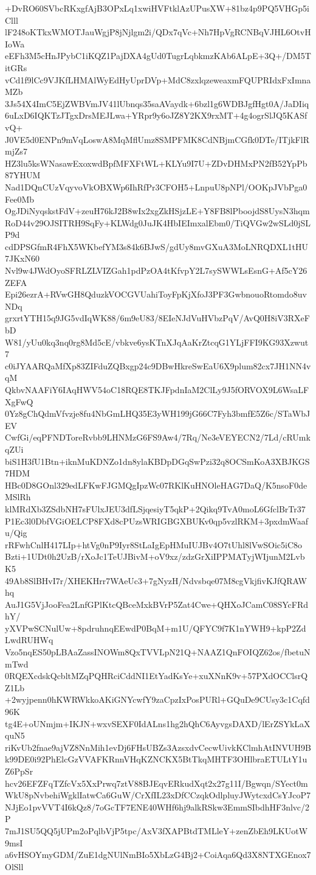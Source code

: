+DvRO60SVbcRKxgfAjB3OPxLq1xwiHVFtklAzUPusXW+81bz4p9PQ5VHGp5iClll
lF248oKTkxWMOTJauWgjP8jNjlgm2i/QDx7qVc+Nh7HpVgRCNBqVJHL6OtvHIoWa
eEFh3M5cHnJPybC1iKQZ1PajDXA4gUd0TugrLqbkmzKAb6ALpE+3Q+/DM5TitGRs
vCd1f9lCc9VJKfLHMAlWyEdHyUprDVp+MdC8zxlqzeweaxmFQUPRIdxFxImnaMZb
3Js54X4ImC5EjZWBVmJV41lUbnqs35saAVaydk+6bzl1g6WDBJgfHgt0A/JaDIiq
6uLxD6IQKTzJTgxDrsMEJLwa+YRpr9y6oJZ8Y2KX9rxMT+4g4ogrSlJQ5KASfvQ+
J0VE5d0ENPn9mVqLoswA8MqMflUmz8SMPFMK8CdNBjmCGfk0DTe/ITjkFlRmjZs7
HZ3lu5ksWNasawExoxwdBpfMFXFtWL+KLYu9I7U+ZDvDHMxPN2fB52YpPb87YHUM
Nad1DQnCUzVqyvoVkOBXWp6IhRfPr3CFOH5+LnpuU8pNPl/OOKpJVbPga0Fee0Mb
OgJDiNyqskstFdV+zeuH76kJ2B8wIx2xgZkHSjzLE+Y8FB8lPboojdS8UysN3hqm
RoD44v29OJSITRH9SqFy+KLWdg0JuJK4HbIEImxalEbm0/TiQVGw2wSLd0jSLP9d
cdDPSGfmR4FhX5WKbefYM3s84k6BJwS/gdUy8mvGXuA3MoLNRQDXL1tHU7JKxN60
Nvl9w4JWdOyoSFRLZLVIZGah1pdPzOA4tKfvpY2L7sySWWLsEsnG+Af5cY26ZEFA
Epi26ezrA+RVwGH8QduzkVOCGVUahiToyFpKjXfoJ3PF3GwbnouoRtomdo8uvNDq
grxrtYTH15q9JG5vdIqWK88/6m9eU83/8EIeNJdVuHVbzPqV/AvQ0H8iV3RXeFbD
W81/yUu0kq3nq0rg8Md5cE/vbkve6ysKTnXJqAaKrZtcqG1YLjFFI9KG93Xzwut7
c0iJYAARQaMfXp83ZIFduZQBxgp24c9DBwHkreSwEaU6X9plum82cx7JH1NN4vqM
QkbvNAAFiY6IAqHWV54oC18RQE8TKJFpdnIaM2ClLy9J5fORVOX9L6WsaLFXgFwQ
0Yz8gChQdmVfvzje8fu4NbGmLHQ35E3yWH199jG66C7Fyh3bmfE5Z6c/STaWbJEV
CwfGi/eqPFNDToreRvbb9LHNMzG6FS9Aw4/7Rq/Ne3eVEYECN2/7Ld/cRUmkqZUi
biS1H3fU1Btn+iknMuKDNZo1dn8ylaKBDpDGqSwPzi32q8OCSmKoA3XBJKGS7HDM
HBc0D8GOnl329edLFKwFJGMQgIpzWc07RKlKuHNOleHAG7DaQ/K5nsoF0deMSlRh
klMRdXb3ZSdbNH7sFUlxJEU3dfLSjqesiyT5qkP+2Qikq9TvA0moL6GfclBrTr37
P1Ec3l0DbfVGiOELCP8FXd8cPUzsWRIGBGXBUKv0qp5vzlRKM+3pxdmWaafu/Qig
rRFwhCnlH417LIp+htVg0nP9Iyr8StLaIgEpHMuIUJBv4O7tUhl8lVwSOic5iC8o
Bzti+1UDt0h2UzB/rXoJc1TeUJBivM+oV9xz/zdzGrXiIPPMATyjWIjunM2LvbK5
49Ab8SlBHvI7r/XHEKHrr7WAeUc3+7gNyzH/Ndvsbqe07M8cgVkjfivKJfQRAWhq
AuJ1G5VjJooFea2LnfGPlKtcQBceMxkBVrP5Zat4Cwe+QHXoJCamC08SYcFRdhY/
yXVPwSCNulUw+8pdruhnqEEwdP0BqM+m1U/QFYC9f7K1nYWH9+kpP2ZdLwdRUHWq
Vzo5nqES50pLBAaZassINOWm8QxTVVLpN21Q+NAAZ1QnFOIQZ62os/fbetuNmTwd
0RQEXcdskQcbltMZqPQHRciCddNI1EtYadKsYe+xuXNnK9v+57PXdOCClsrQZ1Lb
+2wyjpenn0hKWRWkkoAKiGNYcwfY9zaCpzIxPosPURl+GQuDe9CUsy3c1Cqfd96K
tg4E+oUNmjm+IKJN+wxvSEXF0IdALns1hg2hQhC6AyvgsDAXD/lErZSYkLaXquN5
riKvUb2fnae9ajVZ8NnMih1evDj6FHsUBZs3AzsxdvCecwUivkKClmhAtINVUH9B
k99DE0i92PhElcGzVVAFKRnnVHqKZNCKX5BtTkqMHTF3OHlbraETULtY1uZ6PpSr
hcv26EFZFqTZfcVx5XxPrwq7ztV88BJEqvERkudXqt2x27g11I/Bgwqn/SYect0m
WkU8pNvbehiWgklIatwCa6GuW/CrXfIL23xDfCCzqkOdlpluyJWytcxdCsYJcoP7
NJjEo1pvVVT4I6kQz8/7oGcTF7ENE40WHf6hj9alkRSkw3EmmSIbdhHF3nlvc/2P
7mJ1SU5QQ5jUPm2oPqlbVjP5tpc/AxV3fXAPBtdTMLleY+zenZbEh9LKUotW9msI
a6vHSOYmyGDM/ZuE1dgNUlNmBIo5XbLzG4Bj2+CoiAqa6Qd3X8NTXGEnox7OlSll
